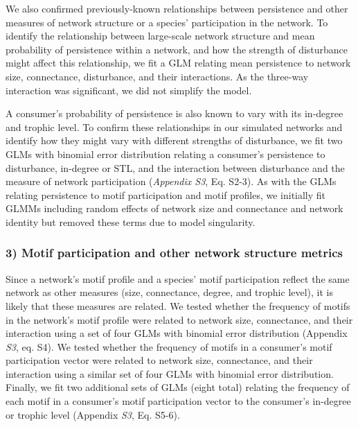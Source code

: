 \documentclass[12pt]{article}
\begin{document}
\begin{spacing}{2.0}
            We also confirmed previously-known relationships between persistence and other measures of network structure or a species' participation in the network.
            To identify the relationship between large-scale network structure and mean probability of persistence within a network, and how the strength of disturbance might affect this relationship, we fit a GLM relating mean persistence to network size, connectance, disturbance, and their interactions.
            As the three-way interaction was significant, we did not simplify the model. 
            

            A consumer's probability of persistence is also known to vary with its in-degree and trophic level.
            To confirm these relationships in our simulated networks and identify how they might vary with different strengths of disturbance, we fit two GLMs with binomial error distribution relating a consumer's persistence to disturbance, in-degree or STL, and the interaction between disturbance and the measure of network participation (\emph{Appendix S3}, Eq. S2-3).
            As with the GLMs relating persistence to motif participation and motif profiles, we initially fit GLMMs including random effects of network size and connectance and network identity but removed these terms due to model singularity.



        \subsubsection*{3) Motif participation and other network structure metrics}

            Since a network's motif profile and a species' motif participation reflect the same network as other measures (size, connectance, degree, and trophic level), it is likely that these measures are related. 
            We tested whether the frequency of motifs in the network's motif profile were related to network size, connectance, and their interaction using a set of four GLMs with binomial error distribution (Appendix \emph{S3}, eq. S4).
            We tested whether the frequency of motifs in a consumer's motif participation vector were related to network size, connectance, and their interaction using a similar set of four GLMs with binomial error distribution.
            Finally, we fit two additional sets of GLMs (eight total) relating the frequency of each motif in a consumer's motif participation vector to the consumer's in-degree or trophic level (Appendix \emph{S3}, Eq. S5-6).
        

\end{spacing}
\end{document}
